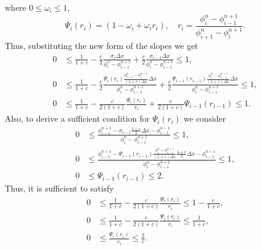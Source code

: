 \documentclass[../thesis.tex]{subfiles}
\begin{document}
where \(0 \leq \omega_{i} \leq 1\),
\begin{equation}
    \Psi_{i}(r_{i}) =
    \left( 1 - \omega_{i} + \omega_{i}r_{i} \right),
    \quad
    r_{i} = \frac{\phi_{i}^{n} - \phi_{i-1}^{n+1}}
    {\phi_{i+1}^{n}-\phi_{i}^{n+1}}.
\end{equation}
Thus, substituting the new form of the slopes we get
\begin{equation}
    \begin{split}
        0
        &\leq
        \frac{1}{1+c}
        -\frac{c}{2}
        \frac{\sigma_{i}\Delta x}
        {\phi_{i}^{n} - \phi_{i-1}^{n+1}}
        +\frac{c}{2}
        \frac{\sigma_{i-1}\Delta x}
        {\phi_{i}^{n} - \phi_{i-1}^{n+1}}
        \leq
        1,
        \\
        0
        &\leq
        \frac{1}{1+c}
        -\frac{c}{2}
        \frac{
            \Psi_{i}(r_{i})
            \frac{\phi_{i+1}^{n}-\phi_{i}^{n+1}}
            {(1+c)\Delta x}\Delta x}
            {\phi_{i}^{n} - \phi_{i-1}^{n+1}}
        +\frac{c}{2}
        \frac{
            \Psi_{i-1}(r_{i-1})
            \frac{\phi_{i}^{n}-\phi_{i-1}^{n+1}}
            {(1+c)\Delta x}\Delta x}
            {\phi_{i}^{n} - \phi_{i-1}^{n+1}}
        \leq
        1,
        \\
        0
        &\leq
        \frac{1}{1+c}
        -\frac{c}{2(1+c)}
        \frac{\Psi_{i}(r_{i})}{r_{i}}
        +\frac{c}{2(1+c)}
        \Psi_{i-1}(r_{i-1})
        \leq
        1.
    \end{split}
\end{equation}
Also, to derive a sufficient condition for \(\Psi_{i}(r_{i})\) we consider
\begin{equation}
    \begin{split}
        0
        &\leq
        \frac{\phi_{i-1}^{n+1}
        -\sigma_{i-1}\frac{1+c}{2}\Delta x
        - \phi_{i-1}^{n-1}}{\phi_{i}^{n} - \phi_{i-1}^{n+1}}
        \leq
        1,
        \\
        0
        &\leq
        \frac{\phi_{i-1}^{n+1}
        -\Psi_{i-1}(r_{i-1})
        \frac{\phi_{i}^{n}-\phi_{i-1}^{n+1}}
        {(1+c)\Delta x}\frac{1+c}{2}\Delta x
        - \phi_{i-1}^{n-1}}{\phi_{i}^{n} - \phi_{i-1}^{n+1}}
        \leq
        1,
        \\
        0
        &\leq
        \Psi_{i-1}(r_{i-1})
        \leq
        2.
    \end{split}
\end{equation}
Thus, it is sufficient to satisfy
\begin{equation}
    \begin{split}
        0
        &\leq
        \frac{1}{1+c}
        -\frac{c}{2(1+c)}
        \frac{\Psi_{i}(r_{i})}{r_{i}}
        \leq
        1 - \frac{c}{1+c},
        \\
        0
        &\leq
        \frac{1}{1+c}
        -\frac{c}{2(1+c)}
        \frac{\Psi_{i}(r_{i})}{r_{i}}
        \leq
        \frac{1}{1+c},
        \\
        0
        &\leq
        \frac{\Psi_{i}(r_{i})}{r_{i}}
        \leq
        \frac{2}{c}.
    \end{split}
\end{equation}
\end{document}
